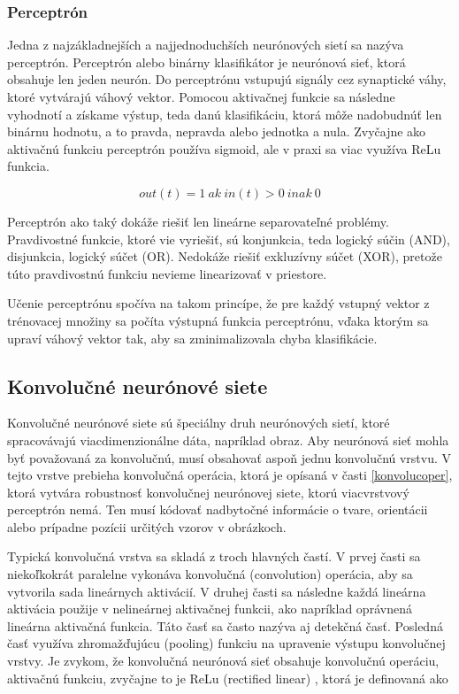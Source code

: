 \subsubsection{Perceptrón}

\hspace{10mm}Jedna z najzákladnejších a najjednoduchších neurónových sietí sa nazýva perceptrón.  Perceptrón alebo binárny klasifikátor je neurónová sieť, ktorá obsahuje len jeden neurón. Do perceptrónu vstupujú signály cez synaptické váhy, ktoré vytvárajú váhový vektor. Pomocou aktivačnej funkcie sa následne vyhodnotí a získame výstup, teda danú klasifikáciu, ktorá môže nadobudnúť len binárnu hodnotu, a to pravda, nepravda alebo jednotka a nula. Zvyčajne ako aktivačnú funkciu perceptrón používa sigmoid, ale v praxi sa viac využíva ReLu funkcia. 

\[out(t) = 1 \ ak\ in(t) > 0 \ inak\  0\]

\hspace{10mm}Perceptrón ako taký dokáže riešiť len lineárne separovateľné problémy. Pravdivostné funkcie, ktoré vie vyriešiť, sú konjunkcia, teda logický súčin (AND), disjunkcia, logický súčet (OR). Nedokáže riešiť exkluzívny súčet (XOR), pretože túto pravdivostnú funkciu nevieme linearizovať v priestore.

\hspace{10mm}Učenie perceptrónu spočíva na takom princípe, že pre každý vstupný vektor z trénovacej množiny sa počíta výstupná funkcia perceptrónu, vďaka ktorým sa upraví váhový vektor tak, aby sa zminimalizovala chyba klasifikácie. \cite{Perceptron:-The-Artificial-Neuron}

\subsection{Konvolučné neurónové siete}

\hspace{10mm}Konvolučné neurónové siete sú špeciálny druh neurónových sietí, ktoré spracovávajú viacdimenzionálne dáta, napríklad obraz. Aby neurónová sieť mohla byť považovaná za konvolučnú, musí obsahovať aspoň jednu konvolučnú vrstvu. V tejto vrstve prebieha konvolučná operácia, ktorá je opísaná v časti \ref{konvolucoper}, ktorá vytvára robustnosť konvolučnej neurónovej siete, ktorú viacvrstvový perceptrón nemá. Ten musí kódovať nadbytočné informácie o tvare, orientácii alebo prípadne pozícii určitých vzorov v obrázkoch.

\hspace{10mm}Typická konvolučná vrstva sa skladá z troch hlavných častí. V prvej časti sa niekoľkokrát paralelne vykonáva konvolučná (convolution) operácia,  aby sa vytvorila sada lineárnych aktivácií. V druhej časti sa následne každá lineárna aktivácia použije v nelineárnej aktivačnej funkcii, ako napríklad oprávnená lineárna aktivačná funkcia. Táto časť sa často nazýva aj detekčná časť. Posledná časť využíva zhromažďujúcu (pooling) funkciu na upravenie výstupu konvolučnej vrstvy. Je zvykom, že konvolučná neurónová sieť obsahuje konvolučnú operáciu, aktivačnú funkciu, zvyčajne to je ReLu (rectified linear)  \cite{Goodfellow-et-al-2016, DBLP:journals/corr/abs-1904-13204}, ktorá je definovaná ako

